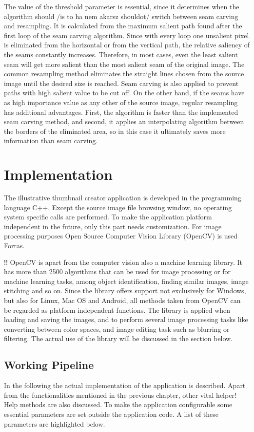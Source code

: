 \documentclass[draft,final]{vutinfth} %
\begin{document}
    The value of the threshold parameter is essential,	since it determines when the algorithm should /is to ha nem akarsz shouldot/ switch between seam carving and resampling. 
	It is calculated from the maximum salient path found after the first loop of the seam carving algorithm.
	Since with every loop one unsalient pixel is eliminated from the horizontal or from the vertical path, the relative saliency of the seams constantly increases.
	Therefore, in most cases, even the least salient seam will get more salient than the most salient seam of the original image. 
	The common resampling method eliminates the straight lines chosen from the source image until the desired size is reached.
	Seam carving is also applied to prevent paths with high salient value to be cut off.
	On the other hand, if the seams have as high importance value as any other of the source image, regular resampling has additional advantages.
	First, the algorithm is faster than the implemented seam carving method, and second, it applies an interpolating algorithm between the borders of the eliminated area, so in this case it ultimately saves more information than seam carving.   
	
	\chapter{Implementation}
	The illustrative thumbnail creator application is developed in the programming language C++.
	Except the source image file browsing window, no operating system specific calls are performed.
	To make the application platform independent in the future, only this part needs customization.
	For image processing purposes Open Source Computer Vision Library (OpenCV) is used Forras.\par 
	!! OpenCV is apart from the computer vision also a machine learning library.     
	It has more than 2500 algorithms that can be used for image processing or for machine learning tasks, among object identification, finding similar images, image stitching and so on.
	Since the library offers support not exclusively for Windows, but also for Linux, Mac OS and Android, all methods taken from OpenCV can be regarded as platform independent functions.
	The library is applied when loading and saving the images, and to perform several image processing tasks like converting between color spaces, and image editing task such as blurring or filtering.
	The actual use of the library will be discussed in the section below.
	
	\section{Working Pipeline}
	In the following the actual implementation of the application is described.
	Apart from the functionalities mentioned in the previous chapter, other vital helper! Help methods are also discussed.
	To make the application configurable some essential parameters are set outside the application code. 
	A list of these parameters are highlighted below.
	
\end{document}
